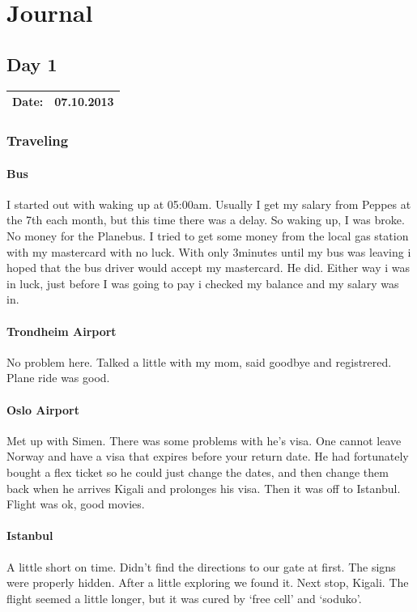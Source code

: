 \appendix
\chapter{Journal}
\section{Day 1}
\begin{tabular}{|c|c|}
\hline
Date: & 07.10.2013 \\
\hline
\end{tabular}
\subsection{Traveling}
\subsubsection{Bus}
I started out with waking up at 05:00am. Usually I get my salary from Peppes at the 7th each month, but this time there was a delay.
So waking up, I was broke. No money for the Planebus. I tried to get some money from the local gas station with my mastercard with no luck.
With only 3minutes until my bus was leaving i hoped that the bus driver would accept my mastercard. He did.
Either way i was in luck, just before I was going to pay i checked my balance and my salary was in.
\subsubsection{Trondheim Airport}
No problem here. Talked a little with my mom, said goodbye and registrered. Plane ride was good.
\subsubsection{Oslo Airport}
Met up with Simen. There was some problems with he's visa. One cannot leave Norway and have a visa that expires before your return date.
He had fortunately bought a flex ticket so he could just change the dates, and then change them back when he arrives Kigali and prolonges his visa.
Then it was off to Istanbul. Flight was ok, good movies.
\subsubsection{Istanbul}
A little short on time. Didn't find the directions to our gate at first. The signs were properly hidden. After a little exploring we found it. Next stop, Kigali.
The flight seemed a little longer, but it was cured by `free cell' and `soduko'.
